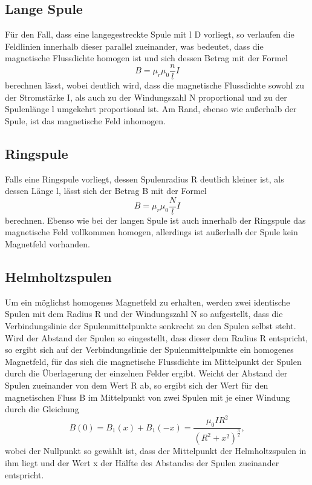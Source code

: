 \subsection{Lange Spule}

Für den Fall, dass eine langegestreckte Spule mit l \gg D vorliegt, so verlaufen die Feldlinien 
innerhalb dieser parallel zueinander, was bedeutet, dass die magnetische Flussdichte homogen 
ist und sich dessen Betrag mit der Formel
\begin{equation}
    B = \mu_r \mu_0 \frac{n}{l} I
\end{equation}
\noindent 
berechnen lässt, wobei deutlich wird, dass die magnetische Flussdichte sowohl zu der Stromstärke I, 
als auch zu der Windungszahl N proportional und zu der Spulenlänge l umgekehrt proportional ist.
Am Rand, ebenso wie außerhalb der Spule, ist das magnetische Feld inhomogen.

\subsection{Ringspule}

Falls eine Ringspule vorliegt, dessen Spulenradius R deutlich kleiner ist, als dessen Länge l, lässt sich
der Betrag B mit der Formel
\begin{equation}
    B = \mu_r \mu_0 \frac{N}{l} I
\end{equation}
\noindent
berechnen. Ebenso wie bei der langen Spule ist auch innerhalb der Ringspule das magnetische Feld
vollkommen homogen, allerdings ist außerhalb der Spule kein Magnetfeld vorhanden.


\subsection{Helmholtzspulen}

Um ein möglichst homogenes Magnetfeld zu erhalten, werden zwei identische Spulen mit dem Radius R und der Windungszahl N 
so aufgestellt, dass die Verbindungslinie der Spulenmittelpunkte senkrecht zu den Spulen selbst steht. Wird der Abstand 
der Spulen so eingestellt, dass dieser dem Radius R entspricht, so ergibt sich auf der Verbindungslinie der 
Spulenmittelpunkte ein homogenes Magnetfeld, für das sich die magnetische Flussdichte im Mittelpunkt der Spulen durch
die Überlagerung der einzelnen Felder ergibt. 
Weicht der Abstand der Spulen zueinander von dem Wert R ab, so ergibt sich der Wert für den magnetischen Fluss B im 
Mittelpunkt von zwei Spulen mit je einer Windung durch die Gleichung
\begin{equation}
    B(0) = B_1(x) + B_1(-x) = \frac{\mu_0 I R^2}{(R^2 + x^2)^\frac{3}{2}},
\end{equation}
\noindent
wobei der Nullpunkt so gewählt ist, dass der Mittelpunkt der Helmholtzspulen in ihm liegt und der Wert x 
der Hälfte des Abstandes der Spulen zueinander entspricht.

